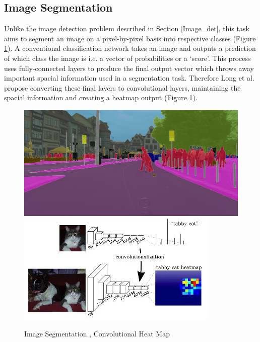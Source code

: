 \documentclass[a4paper,11pt,notitlepage]{article}
\begin{document}
\subsection{Image Segmentation}\label{image_seg}
Unlike the image detection problem described in Section \ref{Image_det}, this task aims to segment an image on a pixel-by-pixel basis into respective classes (Figure \ref{cityscapes_data}). A conventional classification network takes an image and outputs a prediction of which class the image is i.e. a vector of probabilities or a `score'. This process uses fully-connected layers to produce the final output vector which throws away important spacial information used in a segmentation task. Therefore Long et al. \cite{DBLP:journals/corr/LongSD14} propose converting these final layers to convolutional layers, maintaining the spacial information and creating a heatmap output (Figure \ref{cityscapes_data}).

\noindent \begin{figure}[h!]
\includegraphics[width = 0.5\hsize]{./figures/image_seg1.png}
\includegraphics[width = 0.5\hsize]{./figures/sem_im_seg1.jpg}
\caption{Image Segmentation \cite{DBLP:journals/corr/CordtsORREBFRS16}, Convolutional Heat Map \cite{DBLP:journals/corr/LongSD14}}
\label{cityscapes_data}
\end{figure}
\end{document}
